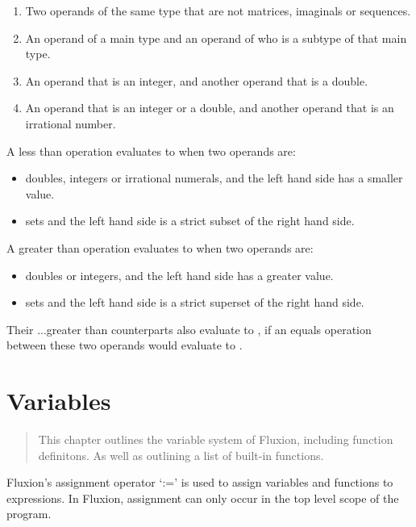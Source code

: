 \documentclass[11pt,a4paper]{book}
\begin{document}
\begin{enumerate}
\item Two operands of the same type that are not matrices, imaginals or sequences.
\item An operand of a main type and an operand of who is a subtype of that main type.
\item An operand that is an integer, and another operand that is a double.
\item An operand that is an integer or a double, and another operand that is an irrational number.
\end{enumerate}

A less than operation evaluates to  when two operands are:

\begin{itemize}
\item doubles, integers or irrational numerals, and the left hand side has a smaller value.
\item sets and the left hand side is a strict subset of the right hand side.
\end{itemize}

A greater than operation evaluates to  when two operands are:

\begin{itemize}
\item doubles or integers, and the left hand side has a greater value.
\item sets and the left hand side is a strict superset of the right hand side.
\end{itemize}

Their ...greater than counterparts also evaluate to , if an equals operation between these two operands would evaluate to .


\chapter{Variables}

\vspace{1em}
\begin{quotation}
This chapter outlines the variable system of Fluxion, including function definitons. As well as outlining a list of built-in functions.
\end{quotation}
\newpage

Fluxion's assignment operator `:=' is used to assign variables and functions to expressions. In Fluxion, assignment can only occur in the top level scope of the program. \\
\end{document}
